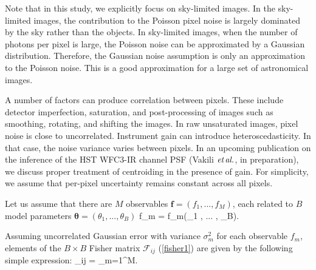 Note that in this study, we explicitly focus on sky-limited images. In the sky-limited images, the contribution 
to the Poisson pixel noise is largely dominated by the sky rather than the objects. In sky-limited images, when the number of photons per pixel is large, the Poisson noise can be approximated by a Gaussian distribution. Therefore, the Gaussian noise assumption is only an approximation to the Poisson noise. This is a good approximation for a large set of astronomical images. 

A number of factors can produce correlation between pixels. These include detector imperfection, saturation, and post-processing of images such as smoothing, rotating, and shifting the images. In raw unsaturated images, pixel noise is close to uncorrelated. Instrument gain can introduce heteroscedasticity. In that case, the noise variance varies between pixels. In an upcoming publication on the inference of the HST WFC3-IR channel PSF (Vakili $\emph{et\,al.}$, in preparation), we discuss proper treatment of centroiding in the presence of gain. For simplicity, we assume that per-pixel uncertainty remains constant across all pixels. 

Let us assume that there are $M$ observables $\mathbf{f} = (f_{1}, ... , f_{M})$, each 
related to $B$ model parameters $\boldsymbol{\mathbf{\theta}} = (\theta_{1} , ... , \theta_{B})$ 
\beq
f_{m} = f_{m}(\theta_{1} , ... , \theta_{B}).
\label{genmodel}
\eeq

Assuming uncorrelated Gaussian error with variance $\sigma^{2}_{m}$ for each observable $f_{m}$, elements
of the $B\times B$ Fisher matrix $\mathcal{F}_{ij}$ (\ref{fisher1}) are given by the following simple expression: 
\beq
{}_{ij} = \sum_{m=1}^{M}.
\label{fisher}
\eeq



